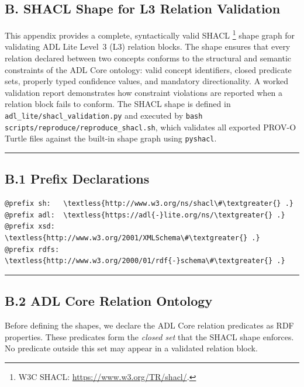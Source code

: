 \subsection{B. SHACL Shape for L3 Relation Validation}\label{b.-shacl-shape-for-l3-relation-validation}

This appendix provides a complete, syntactically valid SHACL \footnote{W3C SHACL: \url{https://www.w3.org/TR/shacl/}.} shape graph for validating ADL Lite Level~3 (L3) relation blocks. The shape ensures that every relation declared between two concepts conforms to the structural and semantic constraints of the ADL Core ontology: valid concept identifiers, closed predicate sets, properly typed confidence values, and mandatory directionality. A worked validation report demonstrates how constraint violations are reported when a relation block fails to conform. The SHACL shape is defined in \texttt{adl\_lite/shacl\_validation.py} and executed by \texttt{bash scripts/reproduce/reproduce\_shacl.sh}, which validates all exported PROV-O Turtle files against the built-in shape graph using \texttt{pyshacl}.

\begin{center}\rule{0.5\linewidth}{0.5pt}\end{center}


\subsection{B.1 Prefix Declarations}\label{b.1-prefix-declarations}

\begin{lstlisting}
@prefix sh:   \textless{http://www.w3.org/ns/shacl\#\textgreater{} .}
@prefix adl:  \textless{https://adl{-}lite.org/ns/\textgreater{} .}
@prefix xsd:  \textless{http://www.w3.org/2001/XMLSchema\#\textgreater{} .}
@prefix rdfs: \textless{http://www.w3.org/2000/01/rdf{-}schema\#\textgreater{} .}
\end{lstlisting}

\begin{center}\rule{0.5\linewidth}{0.5pt}\end{center}


\subsection{B.2 ADL Core Relation Ontology}\label{b.2-adl-core-relation-ontology}

Before defining the shapes, we declare the ADL Core relation predicates as RDF properties. These predicates form the \emph{closed set} that the SHACL shape enforces. No predicate outside this set may appear in a validated relation block.

